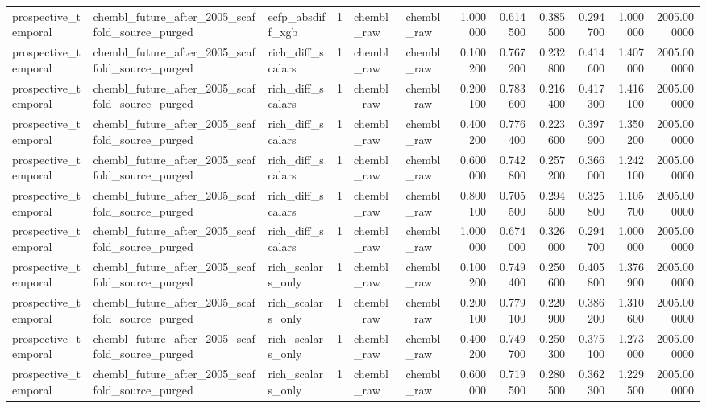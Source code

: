 \begin{longtable}{lllrllrrrrrr}
prospective\_temporal & chembl\_future\_after\_2005\_scaffold\_source\_purged & ecfp\_absdiff\_xgb & 1 & chembl\_raw & chembl\_raw & 1.000000 & 0.614500 & 0.385500 & 0.294700 & 1.000000 & 2005.000000 \\
prospective\_temporal & chembl\_future\_after\_2005\_scaffold\_source\_purged & rich\_diff\_scalars & 1 & chembl\_raw & chembl\_raw & 0.100200 & 0.767200 & 0.232800 & 0.414600 & 1.407000 & 2005.000000 \\
prospective\_temporal & chembl\_future\_after\_2005\_scaffold\_source\_purged & rich\_diff\_scalars & 1 & chembl\_raw & chembl\_raw & 0.200100 & 0.783600 & 0.216400 & 0.417300 & 1.416100 & 2005.000000 \\
prospective\_temporal & chembl\_future\_after\_2005\_scaffold\_source\_purged & rich\_diff\_scalars & 1 & chembl\_raw & chembl\_raw & 0.400200 & 0.776400 & 0.223600 & 0.397900 & 1.350200 & 2005.000000 \\
prospective\_temporal & chembl\_future\_after\_2005\_scaffold\_source\_purged & rich\_diff\_scalars & 1 & chembl\_raw & chembl\_raw & 0.600000 & 0.742800 & 0.257200 & 0.366000 & 1.242100 & 2005.000000 \\
prospective\_temporal & chembl\_future\_after\_2005\_scaffold\_source\_purged & rich\_diff\_scalars & 1 & chembl\_raw & chembl\_raw & 0.800100 & 0.705500 & 0.294500 & 0.325800 & 1.105700 & 2005.000000 \\
prospective\_temporal & chembl\_future\_after\_2005\_scaffold\_source\_purged & rich\_diff\_scalars & 1 & chembl\_raw & chembl\_raw & 1.000000 & 0.674000 & 0.326000 & 0.294700 & 1.000000 & 2005.000000 \\
prospective\_temporal & chembl\_future\_after\_2005\_scaffold\_source\_purged & rich\_scalars\_only & 1 & chembl\_raw & chembl\_raw & 0.100200 & 0.749400 & 0.250600 & 0.405800 & 1.376900 & 2005.000000 \\
prospective\_temporal & chembl\_future\_after\_2005\_scaffold\_source\_purged & rich\_scalars\_only & 1 & chembl\_raw & chembl\_raw & 0.200100 & 0.779100 & 0.220900 & 0.386200 & 1.310600 & 2005.000000 \\
prospective\_temporal & chembl\_future\_after\_2005\_scaffold\_source\_purged & rich\_scalars\_only & 1 & chembl\_raw & chembl\_raw & 0.400200 & 0.749700 & 0.250300 & 0.375100 & 1.273000 & 2005.000000 \\
prospective\_temporal & chembl\_future\_after\_2005\_scaffold\_source\_purged & rich\_scalars\_only & 1 & chembl\_raw & chembl\_raw & 0.600000 & 0.719500 & 0.280500 & 0.362300 & 1.229500 & 2005.000000 \\

\end{longtable}

